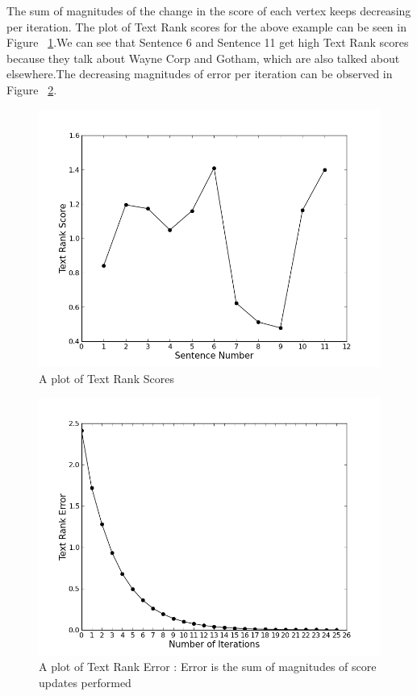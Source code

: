 \documentclass[BTech]{nitgoathesis}
\begin{document}
The sum of magnitudes of the change in the score of each vertex keeps decreasing per iteration. The plot of Text Rank scores for the above example can be seen in Figure ~\ref{fig:tr}.We can see that Sentence 6 and Sentence 11 get high Text Rank scores because they talk about Wayne Corp and Gotham, which are also talked about elsewhere.The decreasing magnitudes of error per iteration can be observed in Figure ~\ref{fig:error}.

\begin{figure}[h!]
  \centering
    \includegraphics[width=.8\textwidth]{images/tr}
    \caption{A plot of Text Rank Scores }
    \label{fig:tr}
\end{figure}

\pagebreak
\begin{figure}[h!]
  \centering
    \includegraphics[width=.8\textwidth]{images/error}
    \caption{A plot of Text Rank Error : Error is the sum of magnitudes of score updates performed}
    \label{fig:error}
\end{figure}
\end{document}
